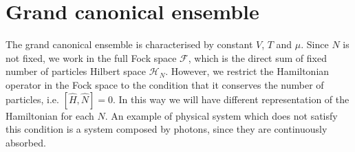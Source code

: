 \section{Grand canonical ensemble}

    The grand canonical ensemble is characterised by constant $V$, $T$ and $\mu$. Since $N$ is not fixed, we work in the full Fock space $\mathcal F$, which is the direct sum of fixed number of particles Hilbert space $\mathcal H_N$. However, we restrict the Hamiltonian operator in the Fock space to the condition that it conserves the number of particles, i.e. $[\hat H, \hat N] = 0$. In this way we will have different representation of the Hamiltonian for each $N$. An example of physical system which does not satisfy this condition is a system composed by photons, since they are continuously absorbed. 


